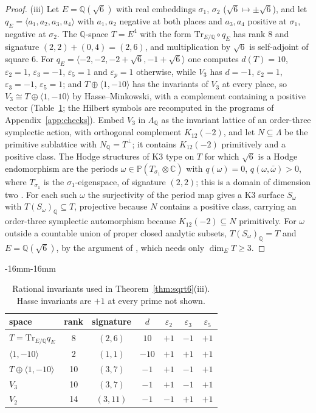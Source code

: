 \documentclass[11pt,reqno]{amsart}
\newenvironment{ruledtabular}{\begin{adjustwidth}{-16mm}{-16mm}\footnotesize\setlength{\tabcolsep}{3.5pt}\centering}{\end{adjustwidth}}
\newcommand{\colrule}{\midrule}
\numberwithin{equation}{section}
\theoremstyle{plain}
\theoremstyle{definition}
\newcommand{\QQ}{\mathbb{Q}}
\newcommand{\CC}{\mathbb{C}}
\newcommand{\PP}{\mathbb{P}}
\newcommand{\Tr}{\mathrm{Tr}}
\begin{document}
\begin{proof}
(iii) Let $E=\QQ(\sqrt6)$ with real embeddings $\sigma_{1}$, $\sigma_{2}$ ($\sqrt6\mapsto\pm\sqrt6$), and let $q_{E}=\langle a_{1},a_{2},a_{3},a_{4}\rangle$ with $a_{1},a_{2}$ negative at both places and $a_{3},a_{4}$ positive at $\sigma_{1}$, negative at $\sigma_{2}$. The $\QQ$-space $T=E^{4}$ with the form $\Tr_{E/\QQ}\circ q_{E}$ has rank $8$ and signature $(2,2)+(0,4)=(2,6)$, and multiplication by $\sqrt6$ is self-adjoint of square $6$. For $q_{E}=\langle-2,-2,-2+\sqrt6,-1+\sqrt6\rangle$ one computes $d(T)=10$, $\varepsilon_{2}=1$, $\varepsilon_{3}=-1$, $\varepsilon_{5}=1$ and $\varepsilon_{p}=1$ otherwise, while $V_{3}$ has $d=-1$, $\varepsilon_{2}=1$, $\varepsilon_{3}=-1$, $\varepsilon_{5}=1$; and $T\oplus\langle1,-10\rangle$ has the invariants of $V_{3}$ at every place, so $V_{3}\cong T\oplus\langle1,-10\rangle$ by Hasse--Minkowski, with a complement containing a positive vector (Table~\ref{tab:invariants}; the Hilbert symbols are recomputed in the programs of Appendix~\ref{app:checks}). Embed $V_{3}$ in $\Lambda_{\QQ}$ as the invariant lattice of an order-three symplectic action, with orthogonal complement $K_{12}(-2)$, and let $N\subseteq\Lambda$ be the primitive sublattice with $N_{\QQ}=T^{\perp}$; it contains $K_{12}(-2)$ primitively and a positive class. The Hodge structures of K3 type on $T$ for which $\sqrt6$ is a Hodge endomorphism are the periods $\omega\in\PP(T_{\sigma_{1}}\otimes\CC)$ with $q(\omega)=0$, $q(\omega,\bar\omega)>0$, where $T_{\sigma_{1}}$ is the $\sigma_{1}$-eigenspace, of signature $(2,2)$; this is a domain of dimension two \cite[Prop.~2.3]{Var23}. For each such $\omega$ the surjectivity of the period map gives a K3 surface $S_{\omega}$ with $T(S_{\omega})_{\QQ}\subseteq T$, projective because $N$ contains a positive class, carrying an order-three symplectic automorphism because $K_{12}(-2)\subseteq N$ primitively. For $\omega$ outside a countable union of proper closed analytic subsets, $T(S_{\omega})_{\QQ}=T$ and $E=\QQ(\sqrt6)$, by the argument of \cite[Thm.~22.9]{BMB26}, which needs only $\dim_{E}T\ge3$.
\end{proof}

\begin{table}[t]
\centering
\caption{Rational invariants used in Theorem~\ref{thm:sqrt6}(iii). Hasse invariants are $+1$ at every prime not shown.}
\label{tab:invariants}
\begin{ruledtabular}
\begin{tabular}{lcccccc}
space & rank & signature & $d$ & $\varepsilon_{2}$ & $\varepsilon_{3}$ & $\varepsilon_{5}$ \\
\colrule
$T=\Tr_{E/\QQ}q_{E}$ & 8 & $(2,6)$ & $10$ & $+1$ & $-1$ & $+1$ \\
$\langle1,-10\rangle$ & 2 & $(1,1)$ & $-10$ & $+1$ & $+1$ & $+1$ \\
$T\oplus\langle1,-10\rangle$ & 10 & $(3,7)$ & $-1$ & $+1$ & $-1$ & $+1$ \\
$V_{3}$ & 10 & $(3,7)$ & $-1$ & $+1$ & $-1$ & $+1$ \\
$V_{2}$ & 14 & $(3,11)$ & $-1$ & $-1$ & $+1$ & $+1$ \\
\end{tabular}
\end{ruledtabular}
\end{table}
\end{document}
